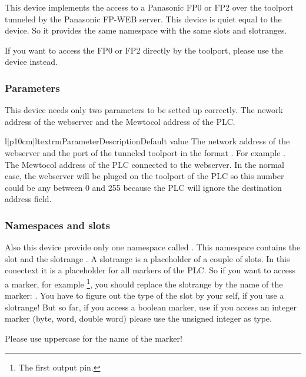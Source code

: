 This device implements the access to a Panasonic FP0 or FP2 over the toolport
tunneled by the Panasonic FP-WEB server. This device is quiet equal to the
 device. So it provides the same namespace with
the same slots and slotranges.

If you want to access the FP0 or FP2 directly by the toolport, please use
the  device instead.

\subsubsection{Parameters}
This device needs only two parameters to be setted up correctly. The nework
address of the webserver and the Mewtocol address of the PLC.
\begin{tableiii}{l|p{10cm}|l}{textrm}{Parameter}{Description}{Default value}
        {The network address of the webserver and the port of the tunneled
        toolport in the format . For example 
        .}
        {}
        {The Mewtocol address of the PLC connected to the webserver. In
        the normal case, the webserver will be pluged on the toolport
        of the PLC so this number could be any between 0 and 255 because
        the PLC will ignore the destination address field.}
        {}
\end{tableiii}

\subsubsection{Namespaces and slots}
Also this device provide only one namespace called . This 
namespace contains the slot  and the slotrange . A
slotrange is a placeholder of a couple of slots. In this conectext it is a
placeholder for all markers of the PLC. So if you want to access a marker,
for example \footnote{The first output pin.}, you should replace
the slotrange by the name of the marker: . 
You have to figure out the type of the slot by your self, if you use
a slotrange! But so far, if you access a boolean marker, use 
if you access an integer marker (byte, word, double word) please use 
the unsigned integer  as type.
\begin{notice}
Please use uppercase for the name of the marker!
\end{notice}

